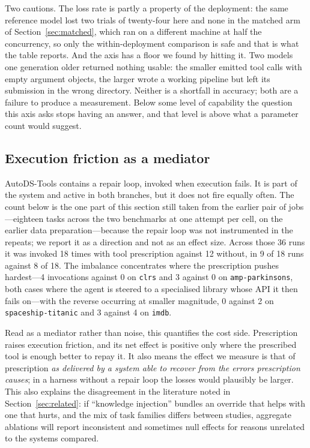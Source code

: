 Two cautions. The loss rate is partly a property of the deployment: the same
reference model lost two trials of twenty-four here and none in the matched arm
of Section~\ref{sec:matched}, which ran on a different machine at half the
concurrency, so only the within-deployment comparison is safe and that is what
the table reports. And the axis has a floor we found by hitting it. Two models
one generation older returned nothing usable: the smaller emitted tool calls with
empty argument objects, the larger wrote a working pipeline but left its
submission in the wrong directory. Neither is a shortfall in accuracy; both are a
failure to produce a measurement. Below some level of capability the question
this axis asks stops having an answer, and that level is above what a parameter
count would suggest.

\subsection{Execution friction as a mediator}

AutoDS-Tools contains a repair loop, invoked when execution fails. It is part of
the system and active in both branches, but it does not fire equally often. The
count below is the one part of this section still taken from the earlier pair of
jobs---eighteen tasks across the two benchmarks at one attempt per cell, on the
earlier data preparation---because the repair loop was not instrumented in the
repeats; we report it as a direction and not as an effect size. Across those 36
runs it was invoked 18 times with tool prescription against 12
without, in 9 of 18 runs against 8 of 18. The imbalance concentrates where the
prescription pushes hardest---4 invocations against 0 on \texttt{clrs} and 3
against 0 on \texttt{amp-parkinsons}, both cases where the agent is steered to a
specialised library whose API it then fails on---with the reverse occurring at
smaller magnitude, 0 against 2 on \texttt{spaceship-titanic} and 3 against 4 on
\texttt{imdb}.

Read as a mediator rather than noise, this quantifies the cost side. Prescription
raises execution friction, and its net effect is positive only where the
prescribed tool is enough better to repay it. It also means the effect we measure
is that of prescription \emph{as delivered by a system able to recover from the
errors prescription causes}; in a harness without a repair loop the losses would
plausibly be larger. This also explains the disagreement in the literature noted
in Section~\ref{sec:related}: if ``knowledge injection'' bundles an override that
helps with one that hurts, and the mix of task families differs between studies,
aggregate ablations will report inconsistent and sometimes null effects for
reasons unrelated to the systems compared.

